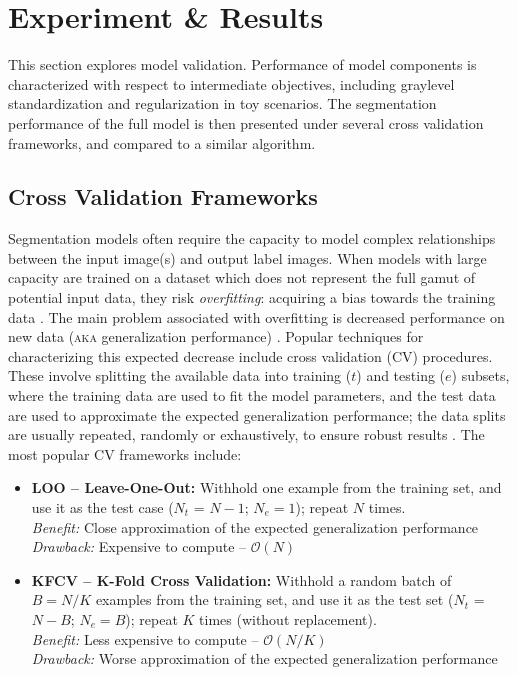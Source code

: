 \chapter{Experiment \& Results}
This section explores model validation. Performance of model components is characterized with respect to intermediate objectives, including graylevel standardization and regularization in toy scenarios. The segmentation performance of the full model is then presented under several cross validation frameworks, and compared to a similar algorithm.
\section{Cross Validation Frameworks}\label{s:CVframeworks}
Segmentation models often require the capacity to model complex relationships between the input image(s) and output label images. When models with large capacity are trained on a dataset which does not represent the full gamut of potential input data, they risk \textit{overfitting}: acquiring a bias towards the training data \cite{Hawkins2004}. The main problem associated with overfitting is decreased performance on new data (\textsc{aka} generalization performance) \cite{Hawkins2004}. Popular techniques for characterizing this expected decrease include cross validation (CV) procedures. These involve splitting the available data into training ($t$) and testing ($e$) subsets, where the training data are used to fit the model parameters, and the test data are used to approximate the expected generalization performance; the data splits are usually repeated, randomly or exhaustively, to ensure robust results \cite{Arlot2010}. The most popular CV frameworks include:
\begin{itemize}
  \item \textbf{LOO -- Leave-One-Out:} Withhold one example from the training set, and use it as the test case ($N_t$ = $N-1$; $N_e = 1$); repeat $N$ times.
  \\\textit{Benefit:} Close approximation of the expected generalization performance
  \\\textit{Drawback:} Expensive to compute -- $\mathcal{O}(N)$
  \item \textbf{KFCV -- K-Fold Cross Validation:} Withhold a random batch of $B = N/K$ examples from the training set, and use it as the test set ($N_t$ = $N-B$; $N_e = B$); repeat $K$ times (without replacement).
  \\\textit{Benefit:} Less expensive to compute -- $\mathcal{O}(N/K)$
  \\\textit{Drawback:} Worse approximation of the expected generalization performance
\end{itemize}
